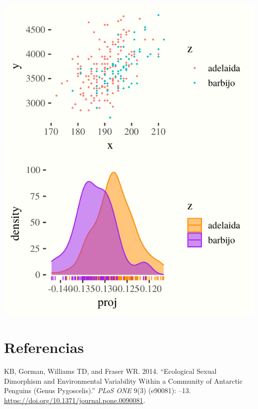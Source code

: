 \documentclass[]{tufte-handout}
\begin{document}
\includegraphics{TP-Labo-2_files/figure-latex/unnamed-chunk-10-1}
\includegraphics{TP-Labo-2_files/figure-latex/unnamed-chunk-10-2}

\hypertarget{referencias}{%
\section*{Referencias}\label{referencias}}

\hypertarget{refs}{}
\leavevmode\hypertarget{ref-R-palmerpenguins}{}%
KB, Gorman, Williams TD, and Fraser WR. 2014. ``Ecological Sexual Dimorphism and Environmental Variability Within a Community of Antarctic Penguins (Genus Pygoscelis).'' \emph{PLoS ONE} 9(3) (e90081): --13. \url{https://doi.org/10.1371/journal.pone.0090081}.
\end{document}
